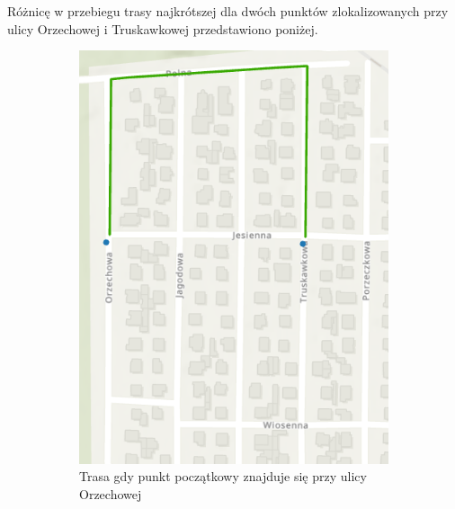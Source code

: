 \documentclass{article}
\begin{document}
Różnicę w przebiegu trasy najkrótszej dla dwóch punktów zlokalizowanych przy ulicy Orzechowej i Truskawkowej przedstawiono poniżej.
\begin{figure}[H]
    \centering
    \begin{subfigure}[b]{0.35\textwidth}
        \centering
        \includegraphics[width=\textwidth]{img/kierunek-orzechowa-truskawkowa.png}
        \caption{Trasa gdy punkt początkowy znajduje się przy ulicy Orzechowej}
    \end{subfigure}
    \hfill
    \begin{subfigure}[b]{0.35\textwidth}
        \centering

\end{subfigure}
\end{figure}
\end{document}
